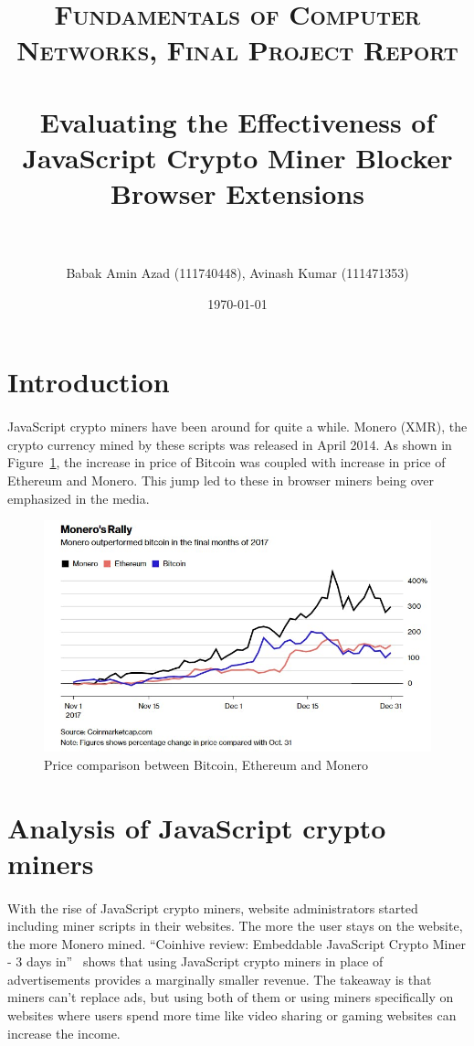 \documentclass[letterpaper]{scrartcl} %
\title{
\normalfont \normalsize
\textsc{Fundamentals of Computer Networks, Final Project Report} \\ [25pt] %
\horrule{0.5pt} \\[0.4cm] %
\huge Evaluating the Effectiveness of JavaScript Crypto Miner Blocker Browser Extensions \\ %
\horrule{2pt} \\[0.5cm] %
}
\author{Babak Amin Azad (111740448), Avinash Kumar (111471353)} %
\date{\normalsize\today} %
\numberwithin{equation}{section} %
\numberwithin{figure}{section} %
\numberwithin{table}{section} %
\begin{document}
\maketitle %


\section{Introduction}
\paragraph{}
JavaScript crypto miners have been around for quite a while. Monero (XMR), the crypto currency mined by these scripts was released in April 2014. As shown in Figure~\ref{fig:bitcoin-increase-price}, the increase in price of Bitcoin was coupled with increase in price of Ethereum and Monero. This jump led to these in browser miners being over emphasized in the media.

\begin{figure}[t]
\centering
\includegraphics[width=0.8\columnwidth]{figures/bitcoin-increase-price.jpeg}
\caption{Price comparison between Bitcoin, Ethereum and Monero }
\label{fig:bitcoin-increase-price}
\end{figure}

\section{Analysis of JavaScript crypto miners}
\paragraph{}
With the rise of JavaScript crypto miners, website administrators started including miner scripts in their websites. The more the user stays on the website, the more Monero mined. ``Coinhive review: Embeddable JavaScript Crypto Miner - 3 days in''~\cite{ref:medium-coinhive} shows that using JavaScript crypto miners in place of advertisements provides a marginally smaller revenue. The takeaway is that miners can't replace ads, but using both of them or using miners specifically on websites where users spend more time like video sharing or gaming websites can increase the income.
\end{document}
